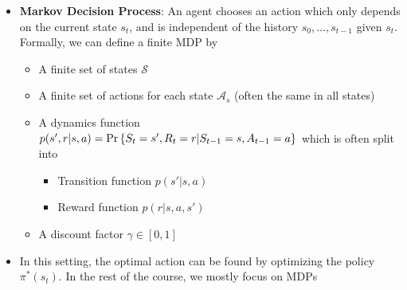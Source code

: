 \begin{itemize}
	\item \textbf{Markov Decision Process}: An agent chooses an action which only depends on the current state $s_t$, and is independent of the history $s_0,...,s_{t-1}$ given $s_t$. Formally, we can define a finite MDP by
	\begin{itemize}
		\item A finite set of states $\mathcal{S}$
		\item A finite set of actions for each state $\mathcal{A}_s$ (often the same in all states)
		\item A dynamics function $p(s',r|s,a)=\Pr\left\{S_t=s',R_t=r|S_{t-1}=s,A_{t-1}=a\right\}$ which is often split into
		\begin{itemize}
			\item Transition function $p(s'|s,a)$
			\item Reward function $p(r|s,a,s')$
		\end{itemize}
		\item A discount factor $\gamma\in[0,1]$
	\end{itemize}
	\item In this setting, the optimal action can be found by optimizing the policy $\pi^{*}(s_t)$. In the rest of the course, we mostly focus on MDPs
\end{itemize}


